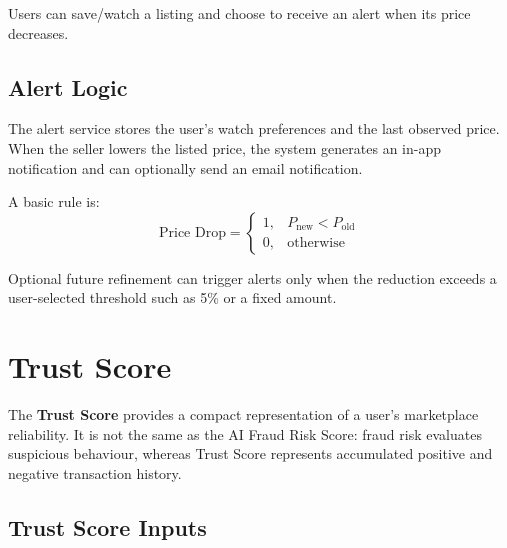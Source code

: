 \documentclass[11pt,a4paper]{article}
\begin{document}
Users can save/watch a listing and choose to receive an alert when its price decreases.

\subsection{Alert Logic}

\begin{center}
\end{center}

The alert service stores the user's watch preferences and the last observed price. When the seller lowers the listed price, the system generates an in-app notification and can optionally send an email notification.

A basic rule is:
\[
\text{Price Drop} =
\begin{cases}
1, & P_{\mathrm{new}} < P_{\mathrm{old}}\\
0, & \text{otherwise}
\end{cases}
\]

Optional future refinement can trigger alerts only when the reduction exceeds a user-selected threshold such as 5\% or a fixed amount.

\section{Trust Score}

The \textbf{Trust Score} provides a compact representation of a user's marketplace reliability. It is not the same as the AI Fraud Risk Score: fraud risk evaluates suspicious behaviour, whereas Trust Score represents accumulated positive and negative transaction history.

\subsection{Trust Score Inputs}
\end{document}
